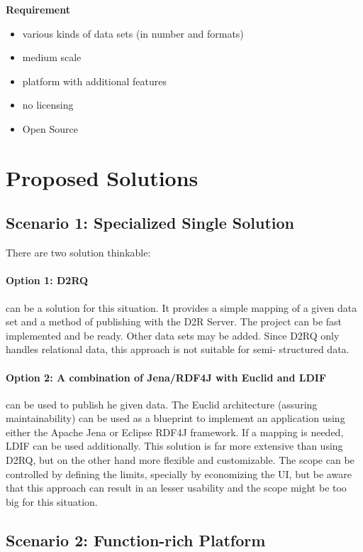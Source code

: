 \textbf{Requirement}
\begin{itemize}
\itemsep0pt
\item various kinds of data sets (in number and formats)
\item medium scale
\item platform with additional features
\item no licensing
\item Open Source
\end{itemize}

\section{Proposed Solutions}

\subsection{Scenario 1: Specialized Single Solution}

There are two solution thinkable:

\paragraph{Option 1: D2RQ} can be a solution for this situation. It provides a 
simple mapping of a given data set and a method of publishing with the D2R Server. 
The project can be fast implemented and be ready. Other data sets may be added. 
Since D2RQ only handles relational data, this approach is not suitable for semi-
structured data.

\paragraph{Option 2: A combination of Jena/RDF4J with Euclid and LDIF} can be used 
to publish he given data. The Euclid architecture (assuring maintainability) can 
be used as a blueprint to implement an application using either the Apache Jena or 
Eclipse RDF4J framework. If a mapping is needed, LDIF can be used additionally. 
This solution is far more extensive than using D2RQ, but on the other hand more 
flexible and customizable. The scope can be controlled by defining the limits, 
specially by economizing the UI, but be aware that this approach can result in an 
lesser usability and the scope might be too big for this situation.

\subsection{Scenario 2: Function-rich Platform}

